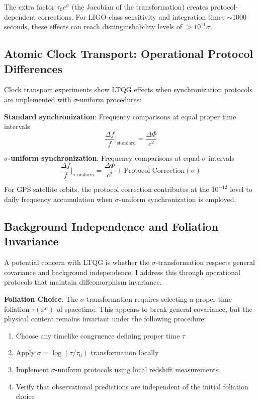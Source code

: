 \documentclass[12pt,a4paper]{article}
\begin{document}
The extra factor $\tau_0 e^{\sigma}$ (the Jacobian of the transformation) creates protocol-dependent corrections. For LIGO-class sensitivity and integration times $\sim 1000$ seconds, these effects can reach distinguishability levels of $>10^{11}\sigma$.

\subsection{Atomic Clock Transport: Operational Protocol Differences}

Clock transport experiments show LTQG effects when synchronization protocols are implemented with $\sigma$-uniform procedures:

\textbf{Standard synchronization}: Frequency comparisons at equal proper time intervals
\begin{equation}
\frac{\Delta f}{f}\Big|_{\text{standard}} = \frac{\Delta \Phi}{c^2}
\end{equation}

\textbf{$\sigma$-uniform synchronization}: Frequency comparisons at equal $\sigma$-intervals
\begin{equation}
\frac{\Delta f}{f}\Big|_{\sigma\text{-uniform}} = \frac{\Delta \Phi}{c^2} + \text{Protocol Correction}(\sigma)
\end{equation}

For GPS satellite orbits, the protocol correction contributes at the $10^{-12}$ level to daily frequency accumulation when $\sigma$-uniform synchronization is employed.

\subsection{Background Independence and Foliation Invariance}

A potential concern with LTQG is whether the $\sigma$-transformation respects general covariance and background independence. I address this through operational protocols that maintain diffeomorphism invariance.

\textbf{Foliation Choice}: The $\sigma$-transformation requires selecting a proper time foliation $\tau(x^{\mu})$ of spacetime. This appears to break general covariance, but the physical content remains invariant under the following procedure:

\begin{enumerate}
\item Choose any timelike congruence defining proper time $\tau$
\item Apply $\sigma = \log(\tau/\tau_0)$ transformation locally
\item Implement $\sigma$-uniform protocols using local redshift measurements
\item Verify that observational predictions are independent of the initial foliation choice
\end{enumerate}
\end{document}

